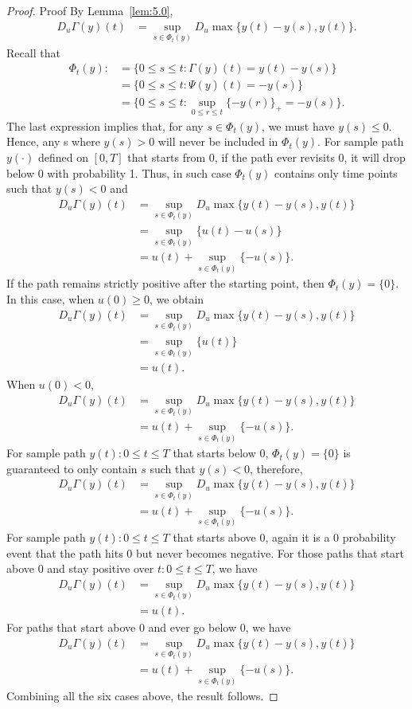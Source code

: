 \documentclass[11pt,leqno]{amsart}
\begin{document}
\begin{proof}{Proof}
By Lemma~\ref{lem:5.0},
\begin{align*}
    D_u\Gamma(y)(t) &= \sup_{s\in \Phi_t(y)} D_u \max\{y(t)-y(s), y(t)\}.
\end{align*}
Recall that 
\begin{align*}
    \Phi_t(y) :&= \{0\leq s \leq t : \Gamma(y)(t) = y(t)-y(s)\} \\
    &= \{0\leq s \leq t : \Psi(y)(t) = -y(s)\}\\
    &= \{0\leq s \leq t : \sup_{0\leq r \leq t} \{-y(r)\}_+ = -y(s)\}.
\end{align*}
The last expression implies that, for any $s\in \Phi_t(y)$, we must have $y(s)\leq 0$. Hence, any s where $y(s)>0$ will never be included in $\Phi_t(y)$.
For sample path $y(\cdot)$ defined on $[0, T]$ that starts from 0, if the path ever revisits 0, it will drop below 0 with probability 1. Thus, in such case $\Phi_t(y)$ contains only time points such that $y(s)<0$ and
\begin{align*}
    D_u\Gamma(y)(t) &= \sup_{s\in \Phi_t(y)} D_u \max\{y(t)-y(s), y(t)\}\\
    &= \sup_{s\in \Phi_t(y)} \{u(t) - u(s)\}\\
    &= u(t) + \sup_{s\in \Phi_t(y)} \{-u(s)\}.
\end{align*}
If the path remains strictly positive after the starting point, then $\Phi_t(y)=\{0\}$. In this case, when $u(0)\geq 0$, we obtain
\begin{align*}
    D_u\Gamma(y)(t) &= \sup_{s\in \Phi_t(y)} D_u \max\{y(t)-y(s), y(t)\}\\
    &= \sup_{s\in \Phi_t(y)} \{u(t)\}\\
    &= u(t).
\end{align*}
When $u(0)< 0$,
\begin{align*}
    D_u\Gamma(y)(t) &= \sup_{s\in \Phi_t(y)} D_u \max\{y(t)-y(s), y(t)\}\\
    &= u(t) + \sup_{s\in \Phi_t(y)} \{-u(s)\}.
\end{align*}
For sample path $y(t):0\leq t\leq T$ that starts below 0, $\Phi_t(y)=\{0\}$ is guaranteed to only contain $s$ such that $y(s)<0$, therefore,
\begin{align*}
    D_u\Gamma(y)(t) &= \sup_{s\in \Phi_t(y)} D_u \max\{y(t)-y(s), y(t)\}\\
    &= u(t) + \sup_{s\in \Phi_t(y)} \{-u(s)\}.
\end{align*}
For sample path $y(t):0\leq t\leq T$ that starts above 0, again it is a $0$ probability event that the path hits 0 but never becomes negative. For those paths that start above 0 and stay positive over $t: 0\leq t\leq T$, we have
\begin{align*}
    D_u\Gamma(y)(t) &= \sup_{s\in \Phi_t(y)} D_u \max\{y(t)-y(s), y(t)\}\\
    &= u(t).
\end{align*}
For paths that start above 0 and ever go below 0, we have
\begin{align*}
    D_u\Gamma(y)(t) &= \sup_{s\in \Phi_t(y)} D_u \max\{y(t)-y(s), y(t)\}\\
    &= u(t) + \sup_{s\in \Phi_t(y)} \{-u(s)\}.
\end{align*}
Combining all the six cases above, the result follows.


\end{proof}
\end{document}
